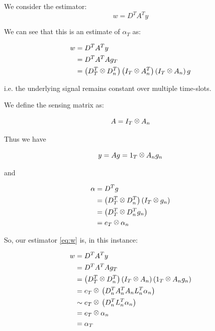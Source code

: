 \begin{definition}
We consider the estimator:
\begin{equation}
w = D^T A^T y
\end{equation}
\label{eq:w}
\end{definition}

\begin{remark}

We can see that this is an estimate of \(\alpha_T\) as:

\begin{align}
w &= D^T A^T y \\
&= D^T A^T A g_T \\
&=\left(D_T^T \kronecker D_n^T\right)\left(I_T \kronecker A_n^T\right)\left(I_T \kronecker A_n\right)g \\
\end{align}

\end{remark}

\begin{example}
i.e. the underlying signal remains constant over multiple time-slots.

We define the sensing matrix as:

\begin{equation}
A = I_T \kronecker A_n
\end{equation}

Thus we have

\begin{equation}
y = Ag = \mathrm{1}_T \kronecker A_n g_n
\end{equation}

and

\begin{align}
\alpha &= D^T g \\
&= \left(D_T^T \kronecker D_n^T \right)\left(I_T \kronecker g_n\right) \\
&=\left(D_T^T \kronecker D_n^T g_n\right) \\
&= e_T \kronecker \alpha_n
\end{align}

So, our estimator \eqref{eq:w} is, in this instance:

\begin{align}
w &= D^T A^T y \\
&= D^T A^T A g_T \\
&=\left(D_T^T \kronecker D_n^T\right)\left(I_T \kronecker A_n\right)\left(\mathrm{1}_T \kronecker A_n g_n\right) \\
&= e_T \kronecker \left(D_n^T A_n^T A_n L_n^T \alpha_n\right)\\
&\sim e_T \kronecker \left(D_n^T L_n^T \alpha_n\right)\\
&= e_T \kronecker \alpha_n \\
&= \alpha_T
\end{align}
\end{example}


